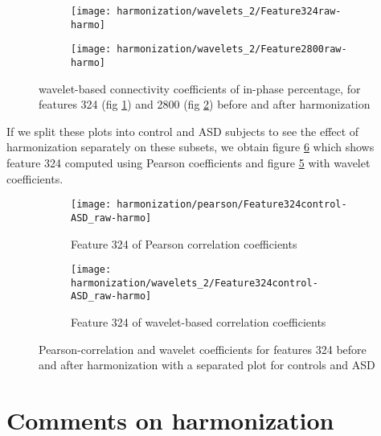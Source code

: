 \documentclass[11pt]{report}
\begin{document}
 \begin{figure}
 \centering
 \begin{subfigure}[b]{1.\textwidth}
    \texttt{[image: harmonization/wavelets\_2/Feature324raw-harmo]}
    \caption{}
    \label{fig:wavelet_feature324}
 \end{subfigure}
 \begin{subfigure}[b]{1.\textwidth}
    \texttt{[image: harmonization/wavelets\_2/Feature2800raw-harmo]}
    \caption{}
    \label{fig:wavelet_feature2800}
 \end{subfigure}
 \caption{wavelet-based connectivity coefficients of in-phase percentage, for features 324 (fig \ref{fig:wavelet_feature324}) and 2800 (fig \ref{fig:wavelet_feature2800}) before and after harmonization}
 \label{fig:wavelet_features_raw-harmo}
 \end{figure}



 If we split these plots into control and ASD subjects to see the effect of harmonization separately on these subsets, we obtain figure \ref{fig:features_control-ASD_raw-harmo} which shows feature 324 computed using Pearson coefficients and figure \ref{fig:feature324-control-ASD_w} with wavelet coefficients.

 \begin{figure}
 \centering
 \begin{subfigure}[b]{1.\textwidth}
    \texttt{[image: harmonization/pearson/Feature324control-ASD\_raw-harmo]}
    \caption{Feature 324 of Pearson correlation coefficients}
    \label{fig:feature324-control-ASD}
 \end{subfigure}
 \begin{subfigure}[b]{1.\textwidth}
    \texttt{[image: harmonization/wavelets\_2/Feature324control-ASD\_raw-harmo]}
    \caption{Feature 324 of wavelet-based correlation coefficients}
    \label{fig:feature324-control-ASD_w}
 \end{subfigure}
 \caption{Pearson-correlation and wavelet coefficients for features 324 before and after harmonization with a separated plot for controls and ASD}
 \label{fig:features_control-ASD_raw-harmo}
 \end{figure}




\section{Comments on harmonization}
\end{document}
